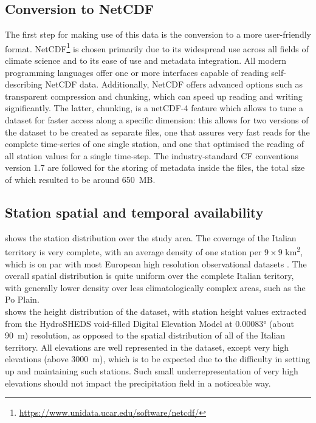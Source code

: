 \subsection{Conversion to NetCDF}\label{sec:netcdf}
The first step for making use of this data is the conversion to a more user-friendly format. NetCDF\footnote{\url{https://www.unidata.ucar.edu/software/netcdf/}} is chosen primarily due to its widespread use across all fields of climate science and to its ease of use and metadata integration. All modern programming languages offer one or more interfaces capable of reading self-describing NetCDF data. Additionally, NetCDF offers advanced options such as transparent compression and chunking, which can speed up reading and writing significantly. The latter, chunking, is a netCDF-4 feature which allows to tune a dataset for faster access along a specific dimension: this allows for two versions of the dataset to be created as separate files, one that assures very fast reads for the complete time-series of one single station, and one that optimised the reading of all station values for a single time-step. The industry-standard CF conventions \citep{Eaton2009} version 1.7 are followed for the storing of metadata inside the files, the total size of which resulted to be around \SI{650}{\mega B}.

\subsection{Station spatial and temporal availability}
 shows the station distribution over the study area. The coverage of the Italian territory is very complete, with an average density of one station per $9\times9$ \si{\kilo\metre\squared}, which is on par with most European high resolution observational datasets \citep[see \cref{sec:obs_datasets} and][for details]{Prein2017}. The overall spatial distribution is quite uniform over the complete Italian teritory, with generally lower density over less climatologically complex areas, such as the Po Plain.\\
 shows the height distribution of the dataset, with station height values extracted from the HydroSHEDS void-filled Digital Elevation Model \citep[][also see \cref{sec:DEM}]{Lehner2008, Lehner2013} at \ang{0.00083} (about \SI{90}{\metre}) resolution, as opposed to the spatial distribution of all of the Italian territory. All elevations are well represented in the dataset, except very high elevations (above \SI{3000}{\metre}), which is to be expected due to the difficulty in setting up and maintaining such stations. Such small underrepresentation of very high elevations should not impact the precipitation field in a noticeable way.

